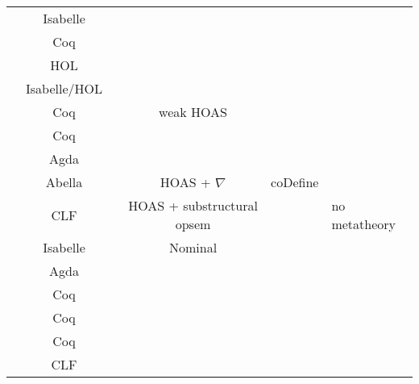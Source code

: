 \begin{center}
\begin{tabular}{l|c|c|c|c|l}
  \cite{Rockl2001}                   & Isabelle               &           &         &             &             \\
  \cite{Henry-Greard1999}            & Coq                    &           &         &             &             \\
  \cite{Gordon1996}                  & HOL                    &           &         &             &             \\
  \cite{Gay2001}                     & Isabelle/HOL           &           &         &             &             \\
  \cite{Despeyroux2000}              & Coq                    &           & weak HOAS         &             &             \\
  \cite{Gillard2000}                 & Coq                    &           &         &             &             \\
  \cite{Perera2018}                  & Agda                   &           &         &             &             \\
  \cite{Tiu2010}                     & Abella                &           & HOAS + $\nabla$        & coDefine             &              \\
  \cite{Cervesato2007}               & CLF                    &           & HOAS + substructural opsem       &             &   no metatheory          \\
  \cite{Bengtson2009}                & Isabelle               &           & Nominal &             &             \\
  \cite{Orchard2016}                 & Agda                   &           &         &             &             \\
  \cite{Castro2020}                  & Coq                    &           &         &             &             \\
  \cite{Zalakain2019}                & Coq                    &           &         &             &             \\
  \cite{Petz2016}                    & Coq                    &           &         &             &             \\
  \cite{Bock2016}                    & CLF                    &           &         &             &             \\

\end{tabular}
\end{center}
